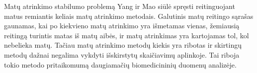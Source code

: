 




Matų atrinkimo stabilumo problemą Yang ir Mao \cite{yang2011robust} siūlė spręsti reitinguojant matus remiantis keliais matų atrinkimo metodais. Galutinis matų reitingo sąrašas gaunamas, kai po kiekvieno matų atrinkimo yra išmetamas vienas, žemiausią reitingą turintis matas iš matų aibės, ir matų atrinkimas yra kartojamas tol, kol nebelieka matų. Tačiau matų atrinkimo metodų kiekis yra ribotas ir skirtingų metodų dažnai negalima vykdyti išskirstytų skaičiavimų aplinkoje. Tai riboja tokio metodo pritaikomumą daugiamačių biomedicininių duomenų analizėje.

